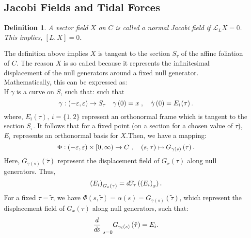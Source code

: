 \documentclass[12pt, a4paper]{report}
\makeatletter
\newcommand\@erelb@r[1]{%
    \mathrel{\tikz[baseline=-.5ex]\draw[#1] (0,0)--(0.3,0);}
    }
\newcommand{\erelbar}[1]{\@erelbar#1}
\def\@erelbar#1#2{%
    \ifcase\numexpr#1*4+#2\relax
        \@erelb@r{-}\or     %
        \@erelb@r{->}\or    %
        \@erelb@r{-|}\or    %
        \@erelb@r{->|}\or   %
        \@erelb@r{<-}\or    %
        \@erelb@r{<->}\or   %
        \@erelb@r{<-|}\or   %
        \@erelb@r{<->}\or   %
        \@erelb@r{|-}\or    %
        \@erelb@r{|->}\or   %
        \@erelb@r{|-|}\or   %
        \@erelb@r{|<->|}\or %
        \@erelb@r{|<-}\or   %
        \@erelb@r{|<->}\or  %
        \@erelb@r{|<-|}\or  %
        \@erelb@r{|<->|}    %
    \else
        \@wrong
    \fi
    }
\theoremstyle{bfnote}
\newtheorem{definition}{Definition}[section]
\makeatother
\begin{document}
\subsection{Jacobi Fields and Tidal Forces}
\begin{definition}
    A vector field $X$ on $C$ is called a normal Jacobi field if $\mathcal{L}_L
    X = 0$. This implies, $\left[L, X\right] = 0$.
\end{definition}
The definition above implies $X$ is tangent to the section $S_\tau$ of the
affine foliation of $C$. The reason $X$ is so called because it represents the
infinitesimal displacement of the null generators around a fixed null generator.
Mathematically, this can be expressed as:\\
If $\gamma$ is a curve on $S$, such that:
such that 
\begin{equation*}
    \gamma: \left(-\varepsilon, \varepsilon\right) \to S_\tau \quad \gamma\left(0\right) = x\;, \quad \dot{\gamma}\left(0\right) = E_i\hspace{-0.1em}\left(\tau\right).
\end{equation*}
where, $E_i\left(\tau\right), \: i = \{1, 2\}$ represent an orthonormal frame
which is tangent to the section $S_\tau$. It follows that for a fixed point (on
a section for a chosen value of $\tau$), $E_i$ represents an orthonormal basis for
$X$.Then, we have a mapping: 
\begin{equation*}
    \Phi : \left(-\varepsilon, \varepsilon\right) \times [0, \infty) \to C\;, \quad \left(s, \tau\right) \erelbar{21} G_{\gamma\left(s\right)}\left(\tau\right).
\end{equation*}
Here, $G_{\gamma\left(s\right)}\left(\tilde{\tau}\right)$ represent the displacement
field of $G_x\left(\tau\right)$ along null generators. Thus,
\begin{equation*}
    \left(E_i\right)_{G_x\left(\tau\right)} = d\hspace{-0.1em}\mathcal{F}_{\hspace{-0.1em}\tau}\left(\left(E_i\right)_x\right).
\end{equation*}
For a fixed $\tau =
\tilde{\tau}$, we have $\Phi\left(s, \tilde{\tau}\right) = \alpha\left(s\right)
= G_{\gamma\left(s\right)}\left(\tilde{\tau}\right)$, which represent the
displacement field of $G_x\left(\tau\right)$ along null generators, such that:
\begin{equation*}
    \frac{d}{d\hspace{-0.1em}s}\bigg|_{s=0}G_{\gamma_i\left(s\right)}\left(\tilde{\tau}\right) = E_i.
\end{equation*}
\end{document}
